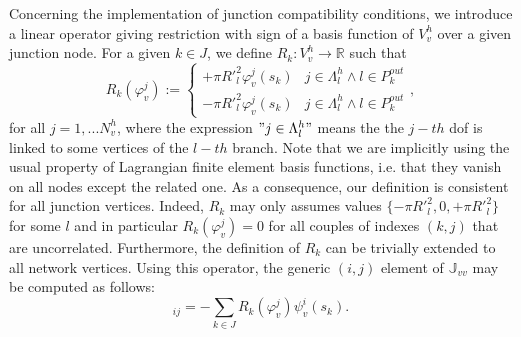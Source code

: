 \documentclass[a4paper]{report}
\begin{document}
Concerning the implementation of junction compatibility conditions, we introduce a linear operator giving restriction with sign of a basis function of $V^h_v$ over a given junction node. For a given $k \in J$, we define $R_k:V^h_v \rightarrow \mathbb{R}$ such that
\begin{equation}
R_k(\varphi^j_v):=
\begin{cases}
+ \pi R'^2_l \varphi^j_v(s_k) & j \in \Lambda^h_l \wedge l \in P^{out}_k\\
- \pi R'^2_l \varphi^j_v(s_k) & j \in \Lambda^h_l \wedge l \in P^{out}_k
\end{cases},
\end{equation}
for all $j=1,...N_v^h$, where the expression $"j \in \Lambda^h_l"$ means the the $j-th$ dof is linked to some vertices of the $l-th$ branch. Note that we are implicitly using the usual property of Lagrangian finite element basis functions, i.e. that they vanish on all nodes except the related one. As a consequence, our definition is consistent for all junction vertices. Indeed, $R_k$ may only assumes values $\{-\pi R'^2_l, 0,+\pi R'^2_l\}$ for some $l$ and in particular $R_k(\varphi^j_v)=0$ for all couples of indexes $(k,j)$ that are uncorrelated. Furthermore, the definition of $R_k$ can be trivially extended to all network vertices. Using this operator, the generic $(i,j)$ element of $\mathbb{J}_{vv}$ may be computed as follows:
\begin{equation*}
[\mathbb{J}_{vv}]_{ij}= - \sum_{k \in J} R_k(\varphi^j_v) \psi^i_v(s_k).
\end{equation*}
\end{document}
